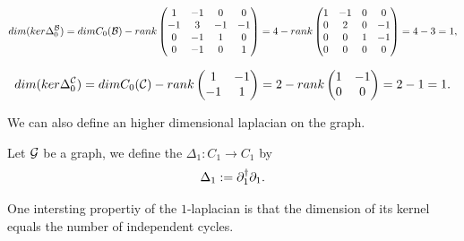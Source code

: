 \documentclass[../2.tex]{subfiles}
\begin{document}
\begin{exa}
        \[ dim(ker\Delta_0^{\mathcal{B}}) =dimC_0(\mathcal{B}) - rank
        \begin{pmatrix}
            1 & -1 & 0 & 0  \\
            -1 & 3 & -1 & -1 \\
            0 & -1 & 1 & 0  \\
            0 & -1 & 0 & 1 
        \end{pmatrix} = 4 - rank
        \begin{pmatrix}
            1 & -1 & 0 & 0  \\
            0 & 2 & 0 & -1 \\
            0 & 0 & 1 & -1  \\
            0 & 0 & 0 & 0 
        \end{pmatrix} = 4 - 3 = 1,\]
        
        \[ dim(ker\Delta_0^{\mathcal{C}}) =dimC_0(\mathcal{C}) - rank
        \begin{pmatrix}
            1 & -1 \\
            -1 & 1
        \end{pmatrix} = 2 - rank
        \begin{pmatrix}
            1 & -1 \\
            0 & 0
        \end{pmatrix} = 2-1 = 1.\]
    \end{exa}

    We can also define an higher dimensional laplacian on the graph.

    \begin{defn}
        Let $\mathcal{G}$ be a graph, we define the  $\Delta_1 : C_1 \to C_1$ by 
        \[ \Delta_1 := \partial_1^\dagger \partial_1.\]
    \end{defn}

    One intersting propertiy of the $1$-laplacian is that the dimension of its kernel equals the number of independent cycles.
\end{document}
